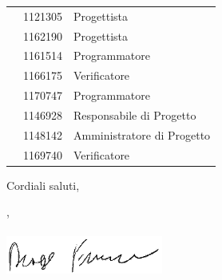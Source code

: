 \documentclass[12pt]{letter}
\begin{document}
\begin{letter}
{\begin{longtable}{ C{4cm} C{3cm} C{6cm} }
                \MC{} & 1121305 & Progettista \\
                \LD{} & 1162190 & Progettista \\
                \CE{} & 1161514 & Programmatore \\
                \SE{} & 1166175 & Verificatore \\
                \PF{} & 1170747 & Programmatore \\
                \DF{} & 1146928 & Responsabile di Progetto \\
                \BR{} & 1148142 & Amministratore di Progetto \\
                \AT{} & 1169740 & Verificatore \\  
            \end{longtable}
        }
        Cordiali saluti,
        \closing{\DF{}, \\ \textit{\Responsabile{}}\\ \includegraphics[width=.6\linewidth]{../DocumentazioneEsterna/PianoDiProgetto/sezioni/Firme/Francesco.png}}
        \vspace{10mm}
    \end{letter}
\end{document}
